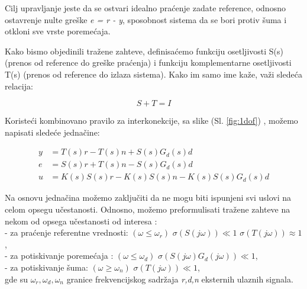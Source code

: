 \documentclass[a4paper,11pt]{article}
\theoremstyle{definition} \newtheorem{deff}{Definicija}[section]
\theoremstyle{definition} \newtheorem{prim}[deff]{Primer}
\theoremstyle{plain} \newtheorem{teor}[deff]{Teorema}
\begin{document}
			\noindent Cilj upravljanje jeste da se ostvari idealno praćenje zadate reference, odnosno ostavrenje nulte greške \textit{e = r - y}, sposobnost sistema da se bori protiv šuma i otkloni sve vrste poremećaja. 
			\vspace{2cm}
			
			Kako bismo objedinili tražene zahteve, definisaćemo funkciju osetljivosti S(s) (prenos od reference do greške praćenja) i funkciju komplementarne osetljivosti T(s) (prenos od reference do izlaza sistema). Kako im samo ime kaže, važi sledeća relacija: 
			
			\begin{equation}
				S + T = I
			\end{equation}
			
			\noindent Koristeći kombinovano pravilo za interkonekcije, sa slike (Sl. \ref{fig:1dof}) , možemo napisati sledeće jednačine:
			
			\begin{equation}
				\begin{split}
					y &= T(s)r - T(s)n + S(s)G_d(s)d \\
					e &= S(s)r + T(s)n - S(s)G_d(s)d \\
					u &= K(s)S(s)r - K(s)S(s)n - K(s)S(s)G_d(s)d
				\end{split}
			\end{equation}
			
			\vspace{2cm}
			Na osnovu jednačina možemo zaključiti da ne mogu biti ispunjeni svi uslovi na celom opsegu učestanosti. Odnosno, možemo preformulisati tražene zahteve na nekom od opsega učestanosti od interesa : \\
			
			- za praćenje referentne vrednosti: $(\omega \leq \omega_r)$ $\sigma(S(j\omega)) \ll 1$ $\sigma(T(j\omega)) \approx 1$, \\
			
			- za potiskivanje poremećaja : $(\omega \leq \omega_d)$ $\sigma(S(j\omega) G_d(j\omega)) \ll 1$,  \\
			
			- za potiskivanje šuma: $(\omega \geq \omega_n)$ $\sigma(T(j\omega)) \ll 1$, \\
			
			gde su $\omega_r, \omega_d, \omega_n$ granice frekvencijskog sadržaja \textit{r,d,n} eksternih ulaznih signala.
			
			
			
			\newpage
			
\end{document}

